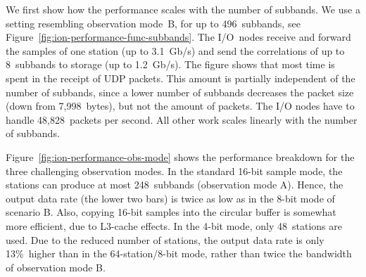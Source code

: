 \documentclass{sig-alternate}
\begin{document}
We first show how the performance scales with the number of subbands.
We use a setting resembling observation mode~\textsf{B}, for up
to 496~subbands, see Figure~\ref{fig:ion-performance-func-subbands}.
The I/O~nodes receive and forward the samples
of one station (up to 3.1~Gb/s) and send the correlations of up to 8~subbands
to storage (up to 1.2~Gb/s).
The figure shows that most time is spent in the receipt of UDP packets.
This amount is partially independent of the number of subbands, since a lower
number of subbands decreases the packet size (down from 7,998~bytes), but not
the amount of packets.
The I/O nodes have to handle 48,828~packets per second.
All other work scales linearly with the number of subbands.

Figure~\ref{fig:ion-performance-obs-mode} shows the performance breakdown
for the three challenging observation modes.
In the standard 16-bit sample mode, the stations can produce at most
248~subbands (observation mode \textsf{A}).
Hence, the output data rate (the lower two bars) is twice as low as in the
8-bit mode of scenario \textsf{B}.
Also, copying 16-bit samples into the circular buffer is somewhat more
efficient, due to L3-cache effects.
In the 4-bit mode, only 48~stations are used.
Due to the reduced number of stations, the output data rate is only 13\%~higher
than in the 64-station/8-bit mode, rather than twice the bandwidth of
observation mode \textsf{B}.


\end{document}
